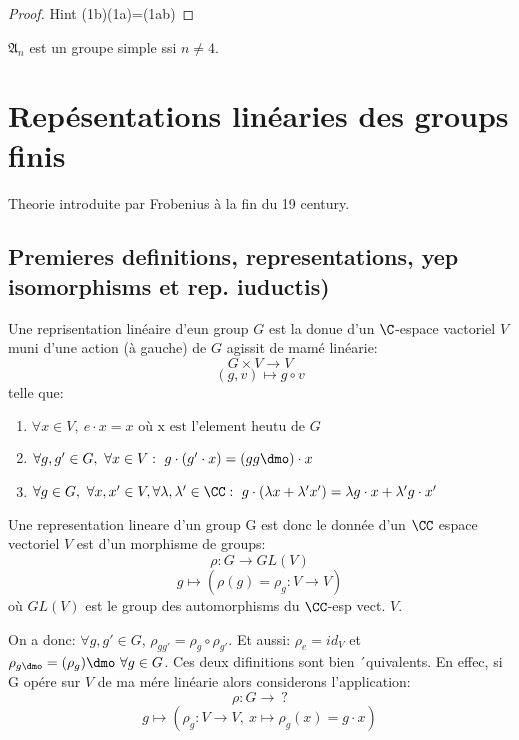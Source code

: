 \begin{proof}
	Hint (1b)(1a)=(1ab)
\end{proof}

\begin{theorem}[Galois]
	$\mathfrak{A}_n$ est un groupe simple ssi $n\neq 4$.
\end{theorem}

\chapter{Repésentations linéaries des groups finis}

Theorie introduite par Frobenius à la fin du 19 century.
\section{Premieres definitions, representations, yep isomorphisms et rep. iuductis)} %
\label{sec:premieres_definitions_representations_yep_isomorphisms_et_rep_iuductis}

\begin{definition}
	Une reprisentation linéaire d'eun group $G$ est la donue d'un $\C$-espace vactoriel $V$ muni d'une action (à gauche) de $G$ agissit de mamé linéarie:
	$$G\times V\rightarrow V$$
	$$(g,v)\mapsto g\circ v$$
	telle que:
	\begin{enumerate}
		\item $\forall x\in V,\ e\cdot x=x \text{ où x est l'element heutu de $G$}$
		\item $\forall g, g' \in G,\ \forall x\in V:\ g\cdot (g'\cdot x)=(gg\dmo)\cdot x$
		\item $\forall g\in G,\ \forall x,x'\in V, \forall \lambda,\lambda'\in\CC:\ g\cdot(\lambda x+\lambda'x')=\lambda g\cdot x+\lambda' g\cdot x'$
	\end{enumerate}
\end{definition}

Une representation lineare d'un group G est donc le donnée d'un $\CC$ espace vectoriel $V$ est d'un morphisme de groups:
	$$\rho:G\rightarrow GL(V)$$
	$$g\mapsto (\rho(g)=\rho_g:V\rightarrow V)$$
où $GL(V)$ est le group des automorphisms du $\CC$-esp vect. $V$.

On a donc: $\forall g,g'\in G$, $\rho_{gg'}=\rho_g\circ \rho_{g'}$. Et aussi: $\rho_e=id_V$ et $\rho_{g\dmo}=(\rho_g)\dmo\ \forall g\in G$.
Ces deux difinitions sont bien ´quivalents. En effec, si G opére sur $V$ de ma mére linéarie alors considerons l'application:
$$\rho:G\rightarrow\ ?$$
$$g\mapsto (\rho_g:V\rightarrow V,\ x\mapsto \rho_g(x)=g\cdot x)$$

